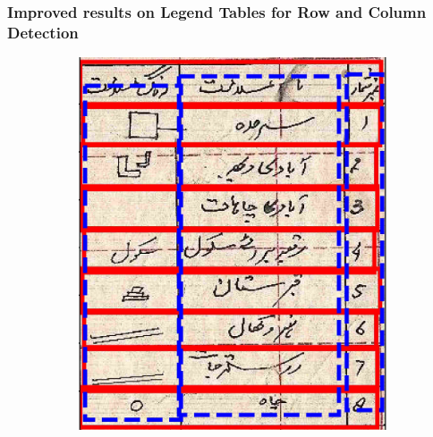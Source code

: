 \subsubsection{Improved results on Legend Tables for Row and Column Detection}
\label{sec:expResults_rowCol_improved}
\begin{figure}[h!]
\centering
\begin{subfigure}{0.47\linewidth}
  \centering
  \includegraphics[width=\linewidth]{rowCol_1483_legend.jpg}
    \caption{}
    \label{}
\end{subfigure}
\begin{subfigure}{0.47\linewidth}
  \centering

\end{subfigure}
\end{figure}

